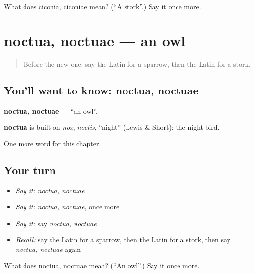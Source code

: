 \begin{tcolorbox}[breakable,colback=teal!4,colframe=teal!35!black,title={Before you move on}]
What does cicōnia, cicōniae mean? (\textquotedblleft{}A stork\textquotedblright{}.) Say it once more.
\end{tcolorbox}
\section[noctua, noctuae]{noctua, noctuae — an owl}

\label{lesson:LA-C192-noctua}



\begin{quote}
Before the new one: say the Latin for a sparrow, then the Latin for a stork.
\end{quote}

\subsection*{You'll want to know: noctua, noctuae}
\textbf{noctua, noctuae} — \textquotedblleft{}an owl\textquotedblright{}.

\begin{cousinweb}
\textbf{noctua} is built on \emph{nox}, \emph{noctis}, \textquotedblleft{}night\textquotedblright{} (Lewis \& Short): the night bird.
\end{cousinweb}

\begin{grammarlens}[title={What you've built}]
One more word for this chapter.
\end{grammarlens}

\subsection*{Your turn}
\begin{itemize}
\raggedright
  \item \emph{Say it:} \emph{noctua, noctuae}
  \item \emph{Say it:} \emph{noctua, noctuae}, once more
  \item \emph{Say it:} say \emph{noctua, noctuae}
  \item \emph{Recall:} say the Latin for a sparrow, then the Latin for a stork, then say \emph{noctua, noctuae} again
\end{itemize}

\begin{tcolorbox}[breakable,colback=teal!4,colframe=teal!35!black,title={Before you move on}]
What does noctua, noctuae mean? (\textquotedblleft{}An owl\textquotedblright{}.) Say it once more.
\end{tcolorbox}
